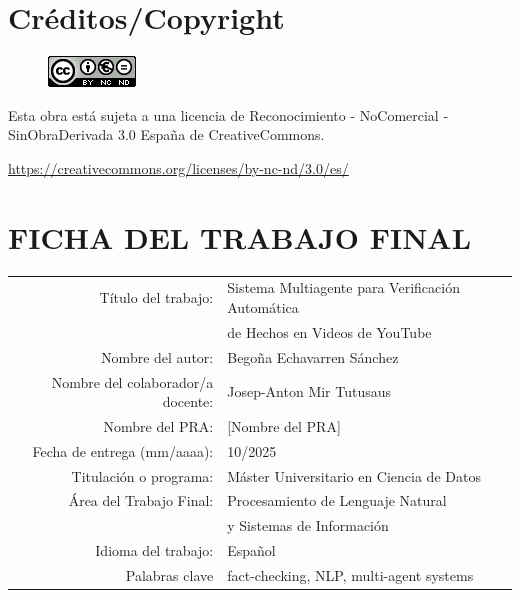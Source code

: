 \newpage
\thispagestyle{empty}

\setcounter{page}{1}
\pagestyle{plain}

\chapter*{Créditos/Copyright}

\vspace{1cm}

\begin{figure}[ht]
    \centering
    \includegraphics[scale=1]{figs/license.png}
\end{figure}

Esta obra está sujeta a una licencia de Reconocimiento - NoComercial - SinObraDerivada 3.0 España de CreativeCommons.

\href{https://creativecommons.org/licenses/by-nc-nd/3.0/es/}{https://creativecommons.org/licenses/by-nc-nd/3.0/es/}

\vspace{1cm}

\chapter*{FICHA DEL TRABAJO FINAL}

\begin{table}[ht]
    \centering{}
    \renewcommand{\arraystretch}{2}
    \begin{tabular}{r | l}
        \hline
        Título del trabajo: & Sistema Multiagente para Verificación Automática\\
        & de Hechos en Videos de YouTube\\
        \hline
        Nombre del autor: & Begoña Echavarren Sánchez\\
        \hline
        Nombre del colaborador/a docente: & Josep-Anton Mir Tutusaus\\
        \hline
        Nombre del PRA: & [Nombre del PRA]\\
        \hline
        Fecha de entrega (mm/aaaa): & 10/2025\\
        \hline
        Titulación o programa: & Máster Universitario en Ciencia de Datos\\
        \hline
        Área del Trabajo Final: & Procesamiento de Lenguaje Natural\\
        & y Sistemas de Información\\
        \hline
        Idioma del trabajo: & Español\\
        \hline
        Palabras clave & fact-checking, NLP, multi-agent systems\\
        \hline
    \end{tabular}
\end{table}
